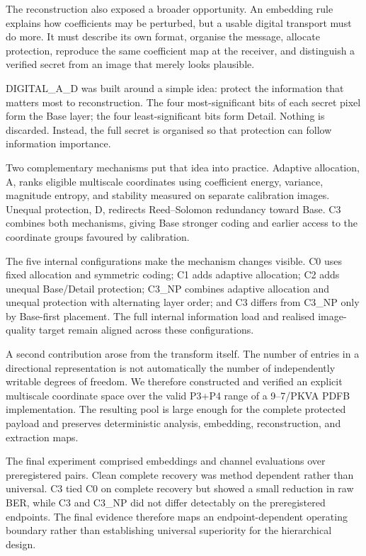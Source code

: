 The reconstruction also exposed a broader opportunity. An embedding rule explains how coefficients may be perturbed, but a usable digital transport must do more. It must describe its own format, organise the message, allocate protection, reproduce the same coefficient map at the receiver, and distinguish a verified secret from an image that merely looks plausible.

DIGITAL\_A\_D was built around a simple idea: protect the information that matters most to reconstruction. The four most-significant bits of each secret pixel form the Base layer; the four least-significant bits form Detail. Nothing is discarded. Instead, the full secret is organised so that protection can follow information importance.

Two complementary mechanisms put that idea into practice. Adaptive allocation, A, ranks eligible multiscale coordinates using coefficient energy, variance, magnitude entropy, and stability measured on separate calibration images. Unequal protection, D, redirects Reed--Solomon redundancy toward Base. C3 combines both mechanisms, giving Base stronger coding and earlier access to the coordinate groups favoured by calibration.

The five internal configurations make the mechanism changes visible. C0 uses fixed allocation and symmetric coding; C1 adds adaptive allocation; C2 adds unequal Base/Detail protection; C3\_NP combines adaptive allocation and unequal protection with alternating layer order; and C3 differs from C3\_NP only by Base-first placement. The full internal information load and realised image-quality target remain aligned across these configurations.

A second contribution arose from the transform itself. The number of entries in a directional representation is not automatically the number of independently writable degrees of freedom. We therefore constructed and verified an explicit multiscale coordinate space over the valid P3+P4 range of a 9--7/PKVA PDFB implementation. The resulting pool is large enough for the complete protected payload and preserves deterministic analysis, embedding, reconstruction, and extraction maps.

The final experiment comprised \FinalEmbeddings{} embeddings and \FinalEvaluations{} channel evaluations over \FinalPairs{} preregistered pairs. Clean complete recovery was method dependent rather than universal. C3 tied C0 on complete recovery but showed a small reduction in raw BER, while C3 and C3\_NP did not differ detectably on the preregistered endpoints. The final evidence therefore maps an endpoint-dependent operating boundary rather than establishing universal superiority for the hierarchical design.

